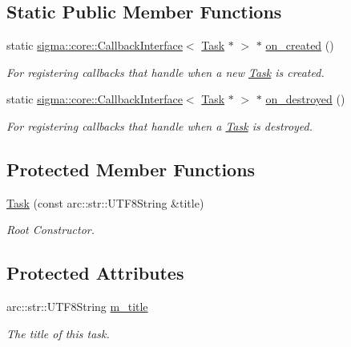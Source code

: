 \subsection*{Static Public Member Functions}
\begin{DoxyCompactItemize}
\item 
static \hyperlink{classsigma_1_1core_1_1_callback_interface}{sigma\+::core\+::\+Callback\+Interface}$<$ \hyperlink{classsigma_1_1core_1_1tasks_1_1_task}{Task} $\ast$ $>$ $\ast$ \hyperlink{classsigma_1_1core_1_1tasks_1_1_task_ab5adda36bbe6b20916f582ffeb311a13}{on\+\_\+created} ()
\begin{DoxyCompactList}\small\item\em For registering callbacks that handle when a new \hyperlink{classsigma_1_1core_1_1tasks_1_1_task}{Task} is created. \end{DoxyCompactList}\item 
static \hyperlink{classsigma_1_1core_1_1_callback_interface}{sigma\+::core\+::\+Callback\+Interface}$<$ \hyperlink{classsigma_1_1core_1_1tasks_1_1_task}{Task} $\ast$ $>$ $\ast$ \hyperlink{classsigma_1_1core_1_1tasks_1_1_task_a720571d12a0e2b41c918f448f5fc81db}{on\+\_\+destroyed} ()
\begin{DoxyCompactList}\small\item\em For registering callbacks that handle when a \hyperlink{classsigma_1_1core_1_1tasks_1_1_task}{Task} is destroyed. \end{DoxyCompactList}\end{DoxyCompactItemize}
\subsection*{Protected Member Functions}
\begin{DoxyCompactItemize}
\item 
\hyperlink{classsigma_1_1core_1_1tasks_1_1_task_af80640d4e44b03d9961b895229a9556d}{Task} (const arc\+::str\+::\+U\+T\+F8\+String \&title)
\begin{DoxyCompactList}\small\item\em Root Constructor. \end{DoxyCompactList}\end{DoxyCompactItemize}
\subsection*{Protected Attributes}
\begin{DoxyCompactItemize}
\item 
\hypertarget{classsigma_1_1core_1_1tasks_1_1_task_ae9795540762ab090896f1474f318e705}{}arc\+::str\+::\+U\+T\+F8\+String \hyperlink{classsigma_1_1core_1_1tasks_1_1_task_ae9795540762ab090896f1474f318e705}{m\+\_\+title}\label{classsigma_1_1core_1_1tasks_1_1_task_ae9795540762ab090896f1474f318e705}

\begin{DoxyCompactList}\small\item\em The title of this task. \end{DoxyCompactList}\end{DoxyCompactItemize}


